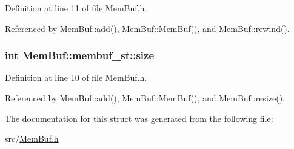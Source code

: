 Definition at line 11 of file MemBuf.h.

Referenced by MemBuf::add(), MemBuf::MemBuf(), and MemBuf::rewind().\hypertarget{structMemBuf_1_1membuf__st_a5ee474be75ca5d65fce37f464d249535}{
\subsubsection[{size}]{\setlength{\rightskip}{0pt plus 5cm}int {\bf MemBuf::membuf\_\-st::size}}}
\label{structMemBuf_1_1membuf__st_a5ee474be75ca5d65fce37f464d249535}


Definition at line 10 of file MemBuf.h.

Referenced by MemBuf::add(), MemBuf::MemBuf(), and MemBuf::resize().

The documentation for this struct was generated from the following file:\begin{DoxyCompactItemize}
\item 
src/\hyperlink{MemBuf_8h}{MemBuf.h}\end{DoxyCompactItemize}
